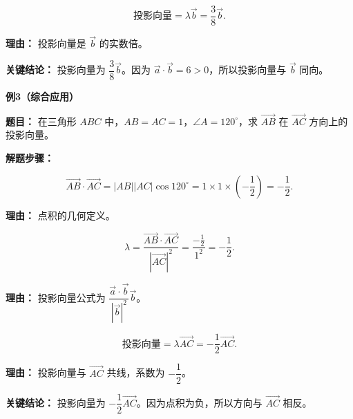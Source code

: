 \begin{examplebox}
\begin{description}[style=nextline, leftmargin=2.8em, labelsep=0.5em, itemsep=0.45em]
		\item[\textbf{第三步（写投影向量）：}]
		      \[
			      \text{投影向量}
			      =
			      \lambda\vec{b}
			      =
			      \frac38\vec{b}.
		      \]
		      \par\textbf{理由：} 投影向量是 $\vec{b}$ 的实数倍。
	\end{description}

	\textbf{\textcolor{CExample}{关键结论：}} 投影向量为 $\dfrac38\vec{b}$。因为 $\vec{a}\cdot\vec{b}=6>0$，所以投影向量与 $\vec{b}$ 同向。

	\medskip
	\textbf{\textcolor{CExample}{例3（综合应用）}}

	\textbf{\textcolor{CExample}{题目：}} 在三角形 $ABC$ 中，$AB=AC=1$，$\angle A=120^\circ$，求 $\overrightarrow{AB}$ 在 $\overrightarrow{AC}$ 方向上的投影向量。

	\textbf{\textcolor{CExample}{解题步骤：}}
	\begin{description}[style=nextline, leftmargin=2.8em, labelsep=0.5em, itemsep=0.45em]
		\item[\textbf{第一步（计算点积）：}]
		      \[
			      \overrightarrow{AB}\cdot\overrightarrow{AC}
			      =
			      |AB||AC|\cos120^\circ
			      =
			      1\times1\times\left(-\frac12\right)
			      =
			      -\frac12.
		      \]
		      \par\textbf{理由：} 点积的几何定义。

		\item[\textbf{第二步（求投影向量系数）：}]
		      \[
			      \lambda
			      =
			      \frac{\overrightarrow{AB}\cdot\overrightarrow{AC}}{|\overrightarrow{AC}|^2}
			      =
			      \frac{-\frac12}{1^2}
			      =
			      -\frac12.
		      \]
		      \par\textbf{理由：} 投影向量公式为 $\dfrac{\vec{a}\cdot\vec{b}}{|\vec{b}|^2}\vec{b}$。

		\item[\textbf{第三步（写投影向量）：}]
		      \[
			      \text{投影向量}
			      =
			      \lambda\overrightarrow{AC}
			      =
			      -\frac12\overrightarrow{AC}.
		      \]
		      \par\textbf{理由：} 投影向量与 $\overrightarrow{AC}$ 共线，系数为 $-\dfrac12$。
	\end{description}

	\textbf{\textcolor{CExample}{关键结论：}} 投影向量为 $-\dfrac12\overrightarrow{AC}$。因为点积为负，所以方向与 $\overrightarrow{AC}$ 相反。
\end{examplebox}